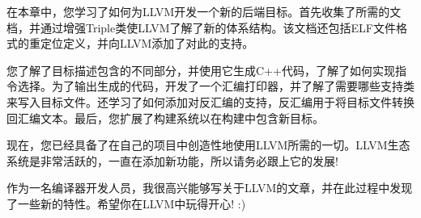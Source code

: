 在本章中，您学习了如何为LLVM开发一个新的后端目标。首先收集了所需的文档，并通过增强Triple类使LLVM了解了新的体系结构。该文档还包括ELF文件格式的重定位定义，并向LLVM添加了对此的支持。\par

您了解了目标描述包含的不同部分，并使用它生成C++代码，了解了如何实现指令选择。为了输出生成的代码，开发了一个汇编打印器，并了解了需要哪些支持类来写入目标文件。还学习了如何添加对反汇编的支持，反汇编用于将目标文件转换回汇编文本。最后，您扩展了构建系统以在构建中包含新目标。\par

现在，您已经具备了在自己的项目中创造性地使用LLVM所需的一切。LLVM生态系统是非常活跃的，一直在添加新功能，所以请务必跟上它的发展!\par

作为一名编译器开发人员，我很高兴能够写关于LLVM的文章，并在此过程中发现了一些新的特性。希望你在LLVM中玩得开心! :)

\newpage